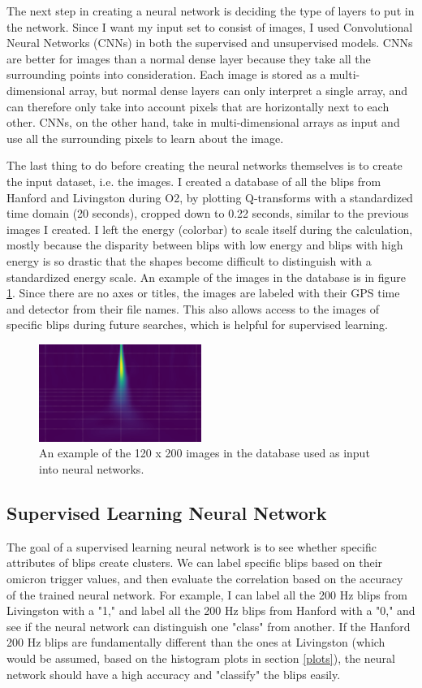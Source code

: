 \documentclass[a4paper]{article}
\begin{document}
The next step in creating a neural network is deciding the type of layers to put in the network. Since I want my input set to consist of images, I used Convolutional Neural Networks (CNNs) in both the supervised and unsupervised models. CNNs are better for images than a normal dense layer because they take all the surrounding points into consideration. Each image is stored as a multi-dimensional array, but normal dense layers can only interpret a single array, and can therefore only take into account pixels that are horizontally next to each other. CNNs, on the other hand, take in multi-dimensional arrays as input and use all the surrounding pixels to learn about the image. 

The last thing to do before creating the neural networks themselves is to create the input dataset, i.e. the images. I created a database of all the blips from Hanford and Livingston during O2, by plotting Q-transforms with a standardized time domain (20 seconds), cropped down to 0.22 seconds, similar to the previous images I created. I left the energy (colorbar) to scale itself during the calculation, mostly because the disparity between blips with low energy and blips with high energy is so drastic that the shapes become difficult to distinguish with a standardized energy scale. An example of the images in the database is in figure \ref{fig:image}. Since there are no axes or titles, the images are labeled with their GPS time and detector from their file names. This also allows access to the images of specific blips during future searches, which is helpful for supervised learning.

\begin{figure}[h!]
	\centering
	\includegraphics[width=.4\linewidth]{image}
	\caption{An example of the 120 x 200 images in the database used as input into neural networks.}
	\label{fig:image}
\end{figure}

\subsection{Supervised Learning Neural Network}

The goal of a supervised learning neural network is to see whether specific attributes of blips create clusters. We can label specific blips based on their omicron trigger values, and then evaluate the correlation based on the accuracy of the trained neural network. For example, I can label all the 200 Hz blips from Livingston with a "1," and label all the 200 Hz blips from Hanford with a "0," and see if the neural network can distinguish one "class" from another. If the Hanford 200 Hz blips are fundamentally different than the ones at Livingston (which would be assumed, based on the histogram plots in section \ref{plots}), the neural network should have a high accuracy and "classify" the blips easily.
\end{document}
